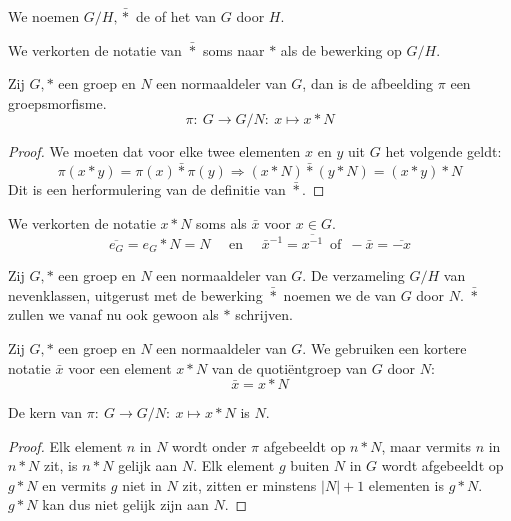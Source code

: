 \documentclass[main.tex]{subfiles}
\begin{document}
\begin{de}
  We noemen $G/H,\bar{*}$ de  of het  van $G$ door $H$.
\end{de}

\begin{de}
  We verkorten de notatie van $\bar{*}$ soms naar $*$ als de bewerking op $G/H$.
\end{de}

\begin{st}
  Zij $G,*$ een groep en $N$ een normaaldeler van $G$, dan is de afbeelding $\pi$ een groepsmorfisme.
  \[ \pi:\ G \rightarrow G/N:\ x \mapsto x*N \]

  \begin{proof}
    We moeten dat voor elke twee elementen $x$ en $y$ uit $G$ het volgende geldt:
    \[ \pi(x*y) = \pi(x) \bar{*} \pi(y) \Rightarrow (x*N)\bar{*}(y*N) = (x*y)*N \]
    Dit is een herformulering van de definitie van $\bar{*}$.
  \end{proof}
\end{st}

\begin{de}
  We verkorten de notatie $x*N$ soms als $\bar{x}$ voor $x\in G$.
  \[ \overline{e_{G}} = e_{G}*N = N \quad\text{ en }\quad \bar{x}^{-1} = \overline{x^{-1}} \,\text{ of }\, -\bar{x} = \overline{-x} \]
\end{de}

\begin{de}
  Zij $G,*$ een groep en $N$ een normaaldeler van $G$.
  De verzameling $G/H$ van nevenklassen, uitgerust met de bewerking $\bar{*}$ noemen we de  van $G$ door $N$.
  $\bar{*}$ zullen we vanaf nu ook gewoon als $*$ schrijven.
\end{de}

\begin{de}
  Zij $G,*$ een groep en $N$ een normaaldeler van $G$.
  We gebruiken een kortere notatie $\bar{x}$ voor een element $x*N$ van de quoti\"entgroep van $G$ door $N$:
  \[ \bar{x} = x*N \]
\end{de}

\begin{ei}
  De kern van $\pi:\ G \rightarrow G/N:\ x \mapsto x*N$ is $N$.

  \begin{proof}
    Elk element $n$ in $N$ wordt onder $\pi$ afgebeeldt op $n*N$, maar vermits $n$ in $n*N$ zit, is $n*N$ gelijk aan $N$.
    Elk element $g$ buiten $N$ in $G$ wordt afgebeeldt op $g*N$ en vermits $g$ niet in $N$ zit, zitten er minstens $|N|+1$ elementen is $g*N$. $g*N$ kan dus niet gelijk zijn aan $N$.
  \end{proof}
\end{ei}
\end{document}

